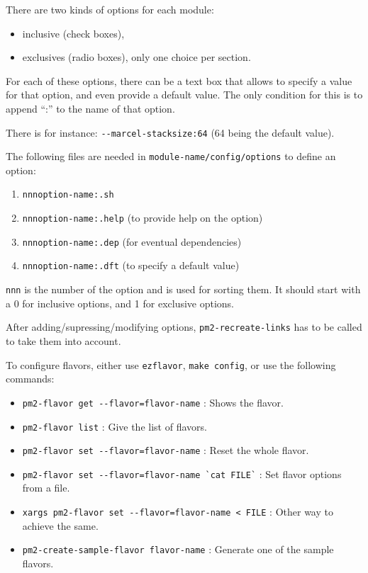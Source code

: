 \documentclass[11pt, a4paper ,twoside]{article}
\begin{document}
There are two kinds of options for each module:
\begin{itemize}
\item inclusive (check boxes),
\item exclusives (radio boxes), only one choice per section.
\end{itemize}

For each of these options, there can be a text box that allows to
specify a value for that option, and even provide a default value.
The only condition for this is to append ``:'' to the name of that
option.

There is for instance: \verb|--marcel-stacksize:64| (64 being the
default value).

The following files are needed in \verb|module-name/config/options| to
define an option:
\begin{enumerate}
\item \verb|nnnoption-name:.sh|
\item \verb|nnnoption-name:.help| (to provide help on the option)
\item \verb|nnnoption-name:.dep| (for eventual dependencies)
\item \verb|nnnoption-name:.dft| (to specify a default value)
\end{enumerate}

\verb+nnn+ is the number of the option and is used for sorting them. It
should start with a 0 for inclusive options, and 1 for exclusive
options.

After adding/supressing/modifying options, \verb+pm2-recreate-links+ has
to be called to take them into account.

To configure flavors, either use \verb+ezflavor+, \verb+make config+, or
use the following commands:
\begin{itemize}
\item \verb|pm2-flavor get --flavor=flavor-name| : Shows the
flavor.
\item \verb|pm2-flavor list| : Give the list of flavors.
\item \verb|pm2-flavor set --flavor=flavor-name| : Reset the whole
flavor.
\item \verb|pm2-flavor set --flavor=flavor-name `cat FILE`| : Set
flavor options from a file.
\item \verb|xargs pm2-flavor set --flavor=flavor-name < FILE| : Other
way to achieve the same.
\item \verb|pm2-create-sample-flavor flavor-name| : Generate one of the
sample flavors.
\end{itemize}
\end{document}
